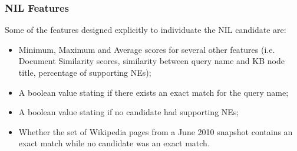 \documentclass[a4paper,11pt]{report}
\begin{document}
\subsubsection{NIL Features}
Some of the features designed explicitly to individuate the NIL candidate are:
\begin{itemize}
\item Minimum, Maximum and Average scores for several other features (i.e. Document Similarity scores, similarity between query name and KB node title, percentage of supporting NEs);
\item A boolean value stating if there exists an exact match for the query name;
\item A boolean value stating if no candidate had supporting NEs;
\item Whether the set of Wikipedia pages from a June 2010 snapshot contains an exact match while no candidate was an exact match.
\end{itemize}
\end{document}
